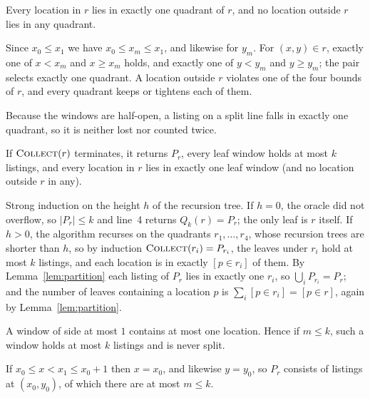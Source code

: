 \begin{lemma}\label{lem:partition}
Every location in $r$ lies in exactly one quadrant of $r$, and no location
outside $r$ lies in any quadrant.
\end{lemma}
\begin{IEEEproof}
Since $x_0\le x_1$ we have $x_0\le x_m\le x_1$, and likewise for $y_m$. For
$(x,y)\in r$, exactly one of $x<x_m$ and $x\ge x_m$ holds, and exactly one of
$y<y_m$ and $y\ge y_m$; the pair selects exactly one quadrant. A location
outside $r$ violates one of the four bounds of $r$, and every quadrant keeps
or tightens each of them.
\end{IEEEproof}

Because the windows are half-open, a listing on a split line falls in exactly
one quadrant, so it is neither lost nor counted twice.

\begin{theorem}\label{thm:correct}
If $\textsc{Collect}(r)$ terminates, it returns $P_r$, every leaf window holds
at most $k$ listings, and every location in $r$ lies in exactly one leaf
window (and no location outside $r$ in any).
\end{theorem}
\begin{IEEEproof}
Strong induction on the height $h$ of the recursion tree. If $h=0$, the oracle
did not overflow, so $|P_r|\le k$ and line~4 returns $Q_k(r)=P_r$; the only
leaf is $r$ itself. If $h>0$, the algorithm recurses on the quadrants
$r_1,\dots,r_4$, whose recursion trees are shorter than $h$, so by induction
$\textsc{Collect}(r_i)=P_{r_i}$, the leaves under $r_i$ hold at most $k$
listings, and each location is in exactly $[p\in r_i]$ of them. By
Lemma~\ref{lem:partition} each listing of $P_r$ lies in exactly one $r_i$, so
$\bigcup_i P_{r_i}=P_r$; and the number of leaves containing a location $p$ is
$\sum_i[p\in r_i]=[p\in r]$, again by Lemma~\ref{lem:partition}.
\end{IEEEproof}

\begin{lemma}\label{lem:unit}
A window of side at most $1$ contains at most one location. Hence if
$m\le k$, such a window holds at most $k$ listings and is never split.
\end{lemma}
\begin{IEEEproof}
If $x_0\le x<x_1\le x_0+1$ then $x=x_0$, and likewise $y=y_0$, so
$P_r$ consists of listings at $(x_0,y_0)$, of which there are at most $m\le k$.
\end{IEEEproof}


